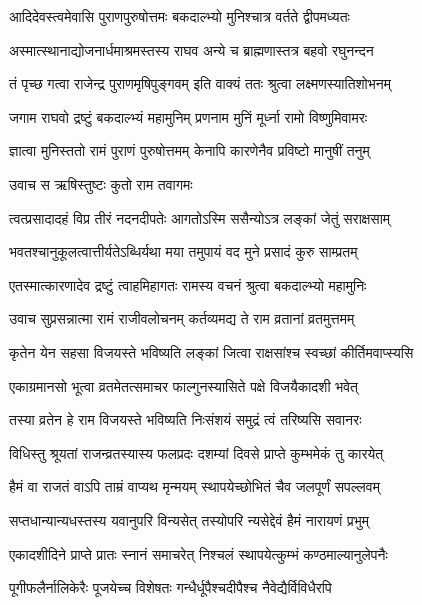 \twolineshloka
{आदिदेवस्त्वमेवासि पुराणपुरुषोत्तमः}
{बकदाल्भ्यो मुनिश्चात्र वर्तते द्वीपमध्यतः}%

\twolineshloka
{अस्मात्स्थानाद्योजनार्धमाश्रमस्तस्य राघव}
{अन्ये च ब्राह्मणास्तत्र बहवो रघुनन्दन}%

\twolineshloka
{तं पृच्छ गत्वा राजेन्द्र पुराणमृषिपुङ्गवम्}
{इति वाक्यं ततः श्रुत्वा लक्ष्मणस्यातिशोभनम्}%

\twolineshloka
{जगाम राघवो द्रष्टुं बकदाल्भ्यं महामुनिम्}
{प्रणनाम मुनिं मूर्ध्ना रामो विष्णुमिवामरः}%

\twolineshloka
{ज्ञात्वा मुनिस्ततो रामं पुराणं पुरुषोत्तमम्}
{केनापि कारणेनैव प्रविष्टो मानुषीं तनुम्}%

\onelineshloka
{उवाच स ऋषिस्तुष्टः कुतो राम तवागमः}%


\twolineshloka
{त्वत्प्रसादादहं विप्र तीरं नदनदीपतेः}
{आगतोऽस्मि ससैन्योऽत्र लङ्कां जेतुं सराक्षसाम्}%

\twolineshloka
{भवतश्चानुकूलत्वात्तीर्यतेऽब्धिर्यथा मया}
{तमुपायं वद मुने प्रसादं कुरु साम्प्रतम्}%

\twolineshloka
{एतस्मात्कारणादेव द्रष्टुं त्वाहमिहागतः}
{रामस्य वचनं श्रुत्वा बकदाल्भ्यो महामुनिः}%

\twolineshloka
{उवाच सुप्रसन्नात्मा रामं राजीवलोचनम्}
{कर्तव्यमद्य ते राम व्रतानां व्रतमुत्तमम्}%

\twolineshloka
{कृतेन येन सहसा विजयस्ते भविष्यति}
{लङ्कां जित्वा राक्षसांश्च स्वच्छां कीर्तिमवाप्स्यसि}%

\twolineshloka
{एकाग्रमानसो भूत्वा व्रतमेतत्समाचर}
{फाल्गुनस्यासिते पक्षे विजयैकादशी भवेत्}%

\twolineshloka
{तस्या व्रतेन हे राम विजयस्ते भविष्यति}
{निःसंशयं समुद्रं त्वं तरिष्यसि सवानरः}%

\twolineshloka
{विधिस्तु श्रूयतां राजन्व्रतस्यास्य फलप्रदः}
{दशम्यां दिवसे प्राप्ते कुम्भमेकं तु कारयेत्}%

\twolineshloka
{हैमं वा राजतं वाऽपि ताम्रं वाप्यथ मृन्मयम्}
{स्थापयेच्छोभितं चैव जलपूर्णं सपल्लवम्}%

\twolineshloka
{सप्तधान्यान्यधस्तस्य यवानुपरि विन्यसेत्}
{तस्योपरि न्यसेद्देवं हैमं नारायणं प्रभुम्}%

\twolineshloka
{एकादशीदिने प्राप्ते प्रातः स्नानं समाचरेत्}
{निश्चलं स्थापयेत्कुम्भं कण्ठमाल्यानुलेपनैः}%

\twolineshloka
{पूगीफलैर्नालिकेरैः पूजयेच्च विशेषतः}
{गन्धैर्धूपैश्चदीपैश्च नैवेद्यैर्विविधैरपि}%


